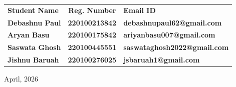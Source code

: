 \begin{center}

    \vspace{5mm}


    \projectFulfillment




    
\begin{table}[H]
\centering
\renewcommand{\arraystretch}{1.3}
    \begin{tabular}{lcl}
    \textbf{Student Name} & \textbf{Reg. Number} & \textbf{Email ID}  \\ 

    \textbf{Debashnu Paul} & \textbf{220100213842} & \textbf{debashnupaul62@gmail.com} \\
    \textbf{Aryan Basu} & \textbf{220100175842} & \textbf{ariyanbasu007@gmail.com} \\
    \textbf{Saswata Ghosh} & \textbf{220100445551} & \textbf{saswataghosh2022@gmail.com} \\
    \textbf{Jishnu Baruah} & \textbf{220100276025} & \textbf{jsbaruah1@gmail.com} \\        
    \end{tabular}
\end{table}







    

    \universityDetailsTitlePage
    \vspace{-0.6cm}

    
    \begin{center}
        {\Large April, 2026 \par}
    \end{center}

    
\end{center}